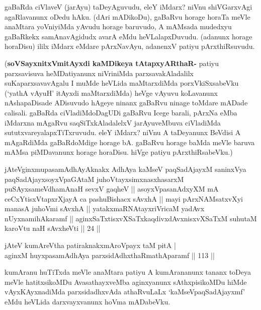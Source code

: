 \begin{artha}
gaBaRda ciVlaveV (jarAyu) taDeyAguvudu, eleY iMdarx? niVnu shiVGarxvAgi 
agaRlavanunx oDedu hAku. (dAri mADikoDu), gaBaRvu horage horaTa meVle 
anaMtara yoVniyiMda yAvudu horage baruvudo, A mAMsada mudedxyu 
gaBaRkekx samAnavAgidudx avarA eMdu heVLalapxDuvudu. (adanunx horage 
horaDisu) ililx iMdarx eMdare pArxNavAyu, adanenxV patiyu 
pArxthiRsuvudu.

(\textbf{soVSayxnitxVmitAyxdi kaMDikeya tAtapxyARthaR-} patiyu 
parxsavisuva heMDatiyanunx niVriniMda parxsavakAladalilx 
suKaparxsavavAgalu I muMde heVLida maMtarxdiMda porxVkiSxsabeVku 
(`yathA vAyuH' itAyxdi maMtarxdiMda) heVge vAyuvu koLavanunx 
nAshapaDisade ADisuvudo hAgeye ninanx gaBaRvu ninage toMdare mADade 
calisali. gaBaRda ciVladiMdoDagUDi gaBaRvu Icege barali, pArxNa eMba 
iMdarxna mAgaRvu saqSiTxkAladalelxV jarAyuveMbuva ciVladiMda 
sututxvareyalapxTiTxruvudu. eleY iMdarx? niVnu A taDeyanunx BeVdisi A 
mAgaRdiMda gaBaRdoMdige horage bA. gaBaRvu horage baMda meVle baruva 
mAMsa piMDavanunx horage horaDisu. hiVge patiyu pArxthiRsabeVku.)
\end{artha}

\begin{shl}
jAteV\s ginxmupasamAdhAyAknakx AdhAya kaMseV paqSadAjayxM saninxVya paqSadAjayxsoyxVpaGAtaM juhoVtayxsimxnasxhasarxM puSAyxsameVdhamAnaH sevxV gaqheV || asoyxVpasanAdxyXM mA ceCxYtisxVtapxrXjayA ca pashuBishacx sAvxhA || mayi pArxNAMsatxvXyi manasA juhoVmi sAvxhA || yatakxmaRNAtayxriVricaM yadAvx nUyxnamihAkaramf || aginxSaTxtisxvXSaTxkaqdivxdAvxnisxvXSaTxM suhutaM karoVtu naH sAvxheVti || 24 ||
\end{shl}


\begin{shl}
jAteV kumAreV\s tha patiraknakxmAroVpayx taM pitA | \\
aginxM huyxpasamAdhAya parxsidAdhxthaRmathAparamf \hfill|| 113 || 
\end{shl}

\begin{artha}
kumAranu huTiTxda meVle anaMtara patiyu A kumArananunx tananx toDeya 
meVle hatitxsikoMDu AvasathayxveMba aginxyanunx sAthxpisikoMDu hiMde 
vAyxKAyxnadiMda parxsidadhxvAda athaRvuLaLx `kaMseVpaqSadAjayxmf' eMdu 
heVLida darxvayxvanunx hoVma mADabeVku.
\end{artha}


